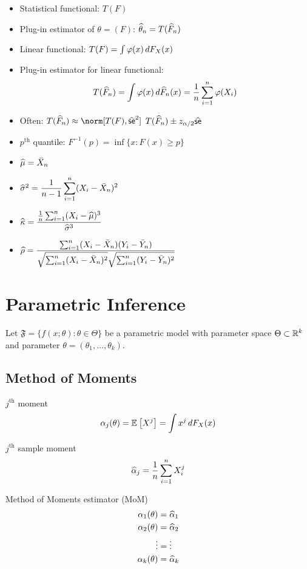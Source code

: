 \documentclass[landscape]{article}
\begin{document}
\begin{multicols*}{2}
\begin{itemize}
  \item Statistical functional: $T(F)$
  \item Plug-in estimator of $\theta = (F)$: $\widehat{\theta}_n = T(\widehat{F}_n)$
  \item Linear functional: $T(F) = \int \varphi(x)\,dF_X(x)$
  \item Plug-in estimator for linear functional: \\
    \[T(\widehat{F}_n)
      = \displaystyle\int \varphi(x)\,d\widehat{F}_n(x)
      = \frac{1}{n}\sum_{i=1}^n \varphi(X_i)\]
  \item Often: $T(\Fnhat) \approx \norm[T(F),\sehat^2]$ \imp
    $T(\widehat{F}_n) \pm z_{\alpha/2}\widehat{\textsf{se}}$
  \item $p^\mathrm{th}$ quantile: $F^{-1}(p) = \inf\{x:F(x) \ge p\}$
  \item $\widehat{\mu} = \bar{X}_n$
  \item $\widehat{\sigma}^2 = \displaystyle\frac{1}{n-1}\sum_{i=1}^n
    (X_i-\bar{X}_n)^2$
  \item  $\widehat{\kappa} =
    \displaystyle\frac{\frac{1}{n}\sum_{i=1}^n(X_i-\widehat{\mu})^3}{\widehat{\sigma}^3}$
  \item $\rhohat = \displaystyle\frac{\sumin(X_i-\samplemean)(Y_i-\bar{Y}_n)}%
    {\sqrt{\sumin(X_i-\samplemean)^2}\sqrt{\sumin(Y_i-\bar{Y}_n)^2}}$
\end{itemize}

\section{Parametric Inference}

Let $\mathfrak{F} = \bigl\{ f(x;\theta) : \theta\in\Theta \bigr\}$ be a
parametric model with parameter space $\Theta \subset \mathbb{R}^k$ and parameter
$\theta = (\theta_1,\dots,\theta_k)$.

\subsection{Method of Moments}

$j^{\mathrm{th}}$ moment
\[\alpha_j(\theta) = \mathbb{E}_{}\left[X^j\right] = \displaystyle\int x^j \,dF_X(x)\]

$j^{\mathrm{th}}$ sample moment
\[\widehat{\alpha}_j = \displaystyle\frac{1}{n}\sum_{i=1}^n X_i^j\]

Method of Moments estimator (MoM)
\begin{align*}
  \alpha_1(\theta) &= \widehat{\alpha}_1 \\
  \alpha_2(\theta) &= \widehat{\alpha}_2 \\
  \vdots &= \vdots \\
  \alpha_k(\theta) &= \widehat{\alpha}_k
\end{align*}


\end{multicols*}
\end{document}
